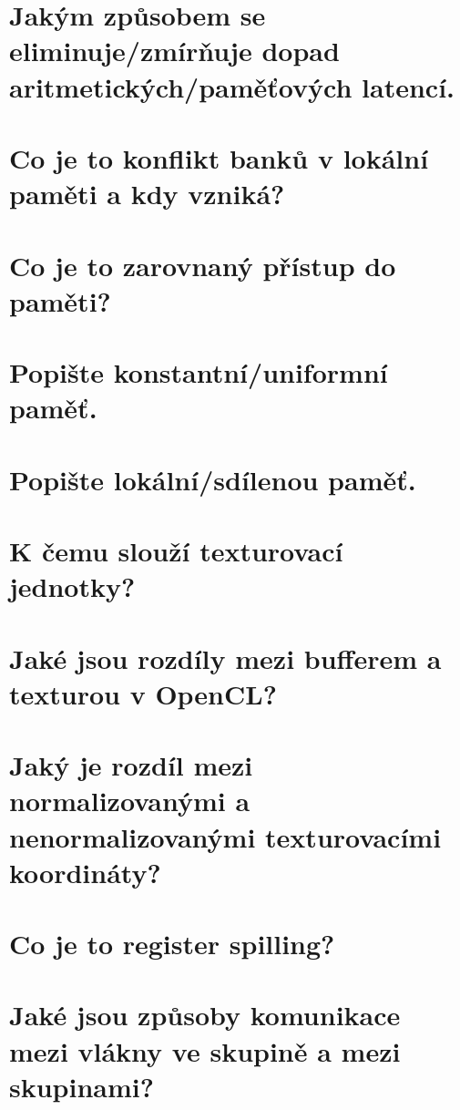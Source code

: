 \section{Jakým způsobem se eliminuje/zmírňuje dopad aritmetických/paměťových latencí.}
	\todo


\section{Co je to konflikt banků v lokální paměti a kdy vzniká?}
	\todo


\section{Co je to zarovnaný přístup do paměti?}
	\todo


\section{Popište konstantní/uniformní paměť.}
	\todo


\section{Popište lokální/sdílenou paměť.}
	\todo


\section{K čemu slouží texturovací jednotky?}
	\todo


\section{Jaké jsou rozdíly mezi bufferem a texturou v OpenCL?}
	\todo


\section{Jaký je rozdíl mezi normalizovanými a nenormalizovanými texturovacími koordináty?}
	\todo


\section{Co je to register spilling?}
	\todo


\section{Jaké jsou způsoby komunikace mezi vlákny ve skupině a mezi skupinami?}
	\todo


